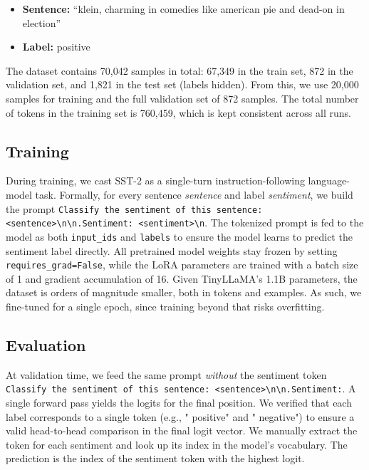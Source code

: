 \documentclass[a4paper,10pt,twocolumn,english]{article}
\begin{document}
\begin{itemize}
    \item \textbf{Sentence:} ``klein, charming in comedies like american pie and dead-on in election''
    \item \textbf{Label:} positive
\end{itemize}

The dataset contains 70,042 samples in total: 67,349 in the train set, 872 in the validation set, and 1,821 in the test set (labels hidden). From this, we use 20,000 samples for training and the full validation set of 872 samples. The total number of tokens in the training set is 760,459, which is kept consistent across all runs.

\subsection{Training} During training, we cast SST-2 as a single-turn instruction-following language-model task. Formally, for every sentence \textit{sentence} and label \textit{sentiment}, we build the prompt \texttt{Classify the sentiment of this sentence: <sentence>\textbackslash n\textbackslash n.Sentiment: <sentiment>\textbackslash n}. The tokenized prompt is fed to the model as both \texttt{input\_ids} and \texttt{labels} to ensure the model learns to predict the sentiment label directly. All pretrained model weights stay frozen by setting \texttt{requires\_grad=False}, while the LoRA parameters are trained with a batch size of 1 and gradient accumulation of 16. Given TinyLLaMA's 1.1B parameters, the dataset is orders of magnitude smaller, both in tokens and examples. As such, we fine-tuned for a single epoch, since training beyond that risks overfitting.

\subsection{Evaluation} At validation time, we feed the same prompt \emph{without} the sentiment token \texttt{Classify the sentiment of this sentence: <sentence>\textbackslash n\textbackslash n.Sentiment:}. A single forward pass yields the logits for the final position. We verified that each label corresponds to a single token (e.g., " positive" and " negative") to ensure a valid head-to-head comparison in the final logit vector. We manually extract the token for each sentiment and look up its index in the model's vocabulary. The prediction is the index of the sentiment token with the highest logit.
\end{document}
